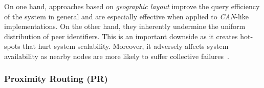 On one hand, approaches based on \emph{geographic layout} improve the query
efficiency of the system in general and are especially effective when applied
to \emph{CAN}-like implementations. On the other hand, they inherently undermine the
uniform distribution of peer identifiers. This is an important downside as it
creates hot-spots that hurt system scalability. 
Moreover, it adversely affects system availability as nearby nodes
are more likely to suffer collective failures~\cite{HY2007}.

%
%
%

\subsubsection{Proximity Routing (PR)}



